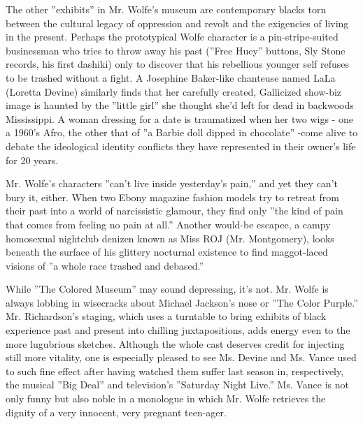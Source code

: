 The other ''exhibits'' in Mr. Wolfe's museum are contemporary blacks
torn between the cultural legacy of oppression and revolt and the
exigencies of living in the present. Perhaps the prototypical Wolfe
character is a pin-stripe-suited businessman who tries to throw away his
past (''Free Huey'' buttons, Sly Stone records, his first dashiki) only
to discover that his rebellious younger self refuses to be trashed
without a fight. A Josephine Baker-like chanteuse named LaLa (Loretta
Devine) similarly finds that her carefully created, Gallicized show-biz
image is haunted by the ''little girl'' she thought she'd left for dead
in backwoods Mississippi. A woman dressing for a date is traumatized
when her two wigs - one a 1960's Afro, the other that of ''a Barbie doll
dipped in chocolate'' -come alive to debate the ideological identity
conflicts they have represented in their owner's life for 20 years.

Mr. Wolfe's characters ''can't live inside yesterday's pain,'' and yet
they can't bury it, either. When two Ebony magazine fashion models try
to retreat from their past into a world of narcissistic glamour, they
find only ''the kind of pain that comes from feeling no pain at all.''
Another would-be escapee, a campy homosexual nightclub denizen known as
Miss ROJ (Mr. Montgomery), looks beneath the surface of his glittery
nocturnal existence to find maggot-laced visions of ''a whole race
trashed and debased.''

While ''The Colored Museum'' may sound depressing, it's not. Mr. Wolfe
is always lobbing in wisecracks about Michael Jackson's nose or ''The
Color Purple.'' Mr. Richardson's staging, which uses a turntable to
bring exhibits of black experience past and present into chilling
juxtapositions, adds energy even to the more lugubrious sketches.
Although the whole cast deserves credit for injecting still more
vitality, one is especially pleased to see Ms. Devine and Ms. Vance used
to such fine effect after having watched them suffer last season in,
respectively, the musical ''Big Deal'' and television's ''Saturday Night
Live.'' Ms. Vance is not only funny but also noble in a monologue in
which Mr. Wolfe retrieves the dignity of a very innocent, very pregnant
teen-ager.

